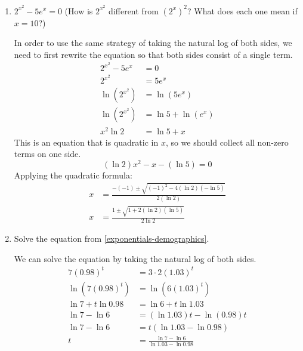 \documentclass{article}
\begin{document}
\begin{enumerate}[resume]
\begin{enumerate}
  \item


    \begin{problem}[\vfill\newpage]
      $2^{x^2} - 5 e^x = 0$ (How is $2^{x^2}$ different from $(2^x)^2$? What does each one mean if $x = 10$?)
    \end{problem}

    \begin{solution}
      In order to use the same strategy of taking the natural log
      of both sides, we need to first rewrite the equation
      so that both sides consist of a single term.
      \begin{align*}
        2^{x^2} - 5 e^x &= 0 \\
        2^{x^2} &= 5e^x \\
        \ln(2^{x^2}) &= \ln(5e^x) \\
        \ln(2^{x^2}) &= \ln5 + \ln(e^x) \\
        x^2 \ln2 &= \ln5 + x
      \end{align*}
      This is an equation that is quadratic in $x$,
      so we should collect all non-zero terms on one side.
      \[(\ln2)x^2 - x - (\ln5) = 0\]
      Applying the quadratic formula:
      \begin{align*}
        x &= \frac{-(-1) \pm \sqrt{(-1)^2 - 4(\ln2)(-\ln5)}}{2(\ln2)}\\
        x &= \boxed{\frac{1\pm\sqrt{1+2(\ln2)(\ln5)}}{2\ln2}}
      \end{align*}
    \end{solution}

  \item


    \begin{problem}[\vfill]
      Solve the equation from \ref{exponentials-demographics}. 
    \end{problem}

    \begin{solution}
      We can solve the equation by taking the natural log of both sides.
      \begin{align*}
        7(0.98)^t &= 3\cdot 2(1.03)^t \\
        \ln(7(0.98)^t) &= \ln(6(1.03)^t) \\
        \ln 7 + t \ln 0.98 &= \ln 6 + t\ln1.03 \\
        \ln 7 - \ln 6 &= (\ln 1.03)t - \ln(0.98) t \\
        \ln 7 - \ln 6 &= t(\ln1.03 - \ln0.98) \\
        t &= \boxed{\frac{\ln 7 - \ln 6}{\ln 1.03 - \ln0.98}}
      \end{align*}
    \end{solution}
  \end{enumerate}


\end{enumerate}
\end{document}
